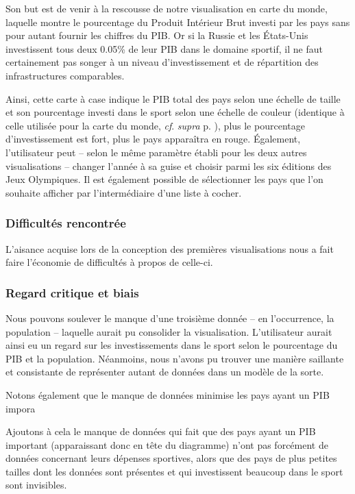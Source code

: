 \documentclass[hidelinks, 12pt]{report}
\begin{document}
Son but est de venir à la rescousse de notre visualisation en carte du monde, laquelle montre le pourcentage du Produit Intérieur Brut investi par les pays sans pour autant fournir les chiffres du PIB. Or si la Russie et les États-Unis investissent tous deux 0.05\% de leur PIB dans le domaine sportif, il ne faut certainement pas songer à un niveau d'investissement et de répartition des infrastructures comparables.

Ainsi, cette carte à case indique le PIB total des pays selon une échelle de taille et son pourcentage investi dans le sport selon une échelle de couleur (identique à celle utilisée pour la carte du monde, \textit{cf}. \textit{supra} p. \pageref{color}), plus le pourcentage d'investissement est fort, plus le pays apparaîtra en rouge. Également, l'utilisateur peut -- selon le même paramètre établi pour les deux autres visualisations -- changer l'année à sa guise et choisir parmi les six éditions des Jeux Olympiques. Il est également possible de sélectionner les pays que l'on souhaite afficher par l'intermédiaire d'une liste à cocher.

\subsubsection{Difficultés rencontrée}

L'aisance acquise lors de la conception des premières visualisations nous a fait faire l'économie de difficultés à propos de celle-ci.

\subsubsection{Regard critique et biais}

Nous pouvons soulever le manque d'une troisième donnée -- en l'occurrence, la population -- laquelle aurait pu consolider la visualisation. L'utilisateur aurait ainsi eu un regard sur les investissements dans le sport selon le pourcentage du PIB et la population. Néanmoins, nous n'avons pu trouver une manière saillante et consistante de représenter autant de données dans un modèle de la sorte.



Notons également que le manque de données minimise les pays ayant un PIB impora

Ajoutons à cela le manque de données qui fait que des pays ayant un PIB important (apparaissant donc en tête du diagramme) n’ont pas forcément de données concernant leurs dépenses sportives, alors que des pays de plus petites tailles dont les données sont présentes et qui investissent beaucoup dans le sport sont invisibles. 
\end{document}
